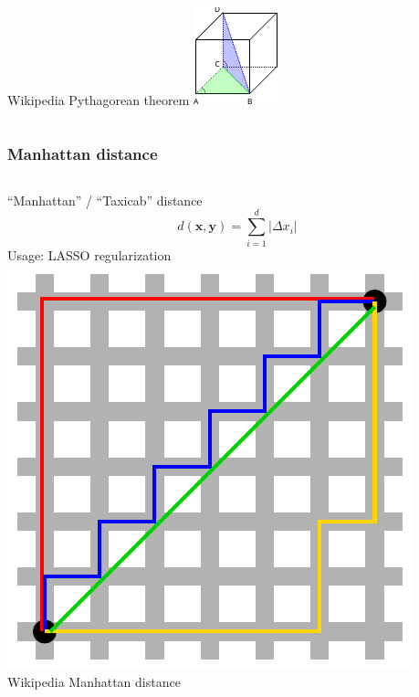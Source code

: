 \documentclass[Nike]{tuberlinbeamer}
\newcommand{\x}{\boldsymbol{x}}
\newcommand{\y}{\boldsymbol{y}}
\begin{document}
\begin{frame}[t]
\begin{columns}[T]
      \tiny Wikipedia Pythagorean theorem
      \vskip 2mm
      \includegraphics[width=.7\textwidth]{ndeuclidean.pdf}
  \end{columns}
\end{frame}

\begin{frame}[t]
  \frametitle{Manhattan distance}
  \begin{columns}[T]
      ``Manhattan'' / ``Taxicab'' distance
      \begin{equation*}
        d(\x, \y) = \sum_{i=1}^d |\Delta x_i|
      \end{equation*}
      Usage: LASSO regularization
      \includegraphics[width=\textwidth]{manhattan.pdf}
      \tiny Wikipedia Manhattan distance
  \end{columns}
\end{frame}
\end{document}
